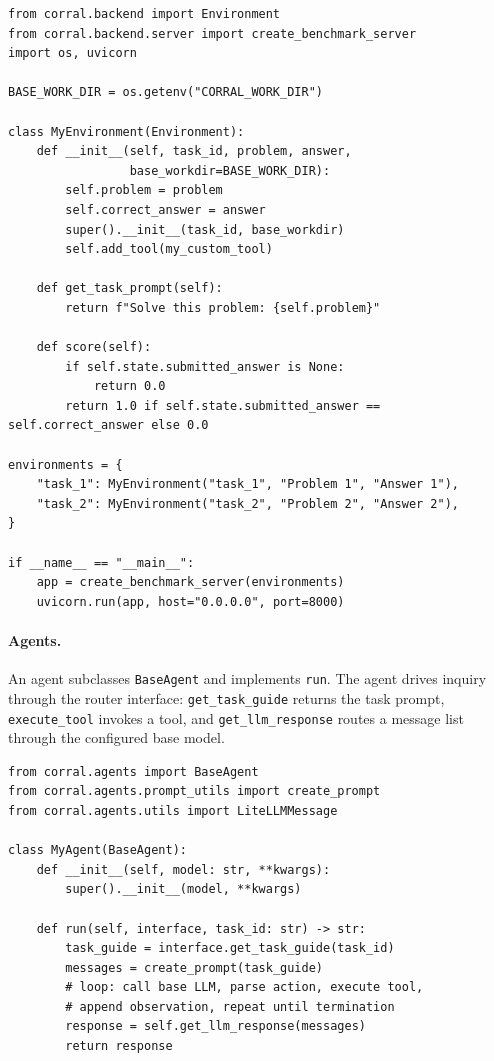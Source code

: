 \begin{lstlisting}[caption={Defining and serving an environment.}]
from corral.backend import Environment
from corral.backend.server import create_benchmark_server
import os, uvicorn

BASE_WORK_DIR = os.getenv("CORRAL_WORK_DIR")

class MyEnvironment(Environment):
    def __init__(self, task_id, problem, answer,
                 base_workdir=BASE_WORK_DIR):
        self.problem = problem
        self.correct_answer = answer
        super().__init__(task_id, base_workdir)
        self.add_tool(my_custom_tool)

    def get_task_prompt(self):
        return f"Solve this problem: {self.problem}"

    def score(self):
        if self.state.submitted_answer is None:
            return 0.0
        return 1.0 if self.state.submitted_answer == self.correct_answer else 0.0

environments = {
    "task_1": MyEnvironment("task_1", "Problem 1", "Answer 1"),
    "task_2": MyEnvironment("task_2", "Problem 2", "Answer 2"),
}

if __name__ == "__main__":
    app = create_benchmark_server(environments)
    uvicorn.run(app, host="0.0.0.0", port=8000)
\end{lstlisting}

\paragraph{Agents.} An agent subclasses \texttt{BaseAgent} and implements \texttt{run}. The agent drives inquiry through the router interface: \texttt{get\_task\_guide} returns the task prompt, \texttt{execute\_tool} invokes a tool, and \texttt{get\_llm\_response} routes a message list through the configured base model.

\begin{lstlisting}[caption={Defining a custom scaffold.}]
from corral.agents import BaseAgent
from corral.agents.prompt_utils import create_prompt
from corral.agents.utils import LiteLLMMessage

class MyAgent(BaseAgent):
    def __init__(self, model: str, **kwargs):
        super().__init__(model, **kwargs)

    def run(self, interface, task_id: str) -> str:
        task_guide = interface.get_task_guide(task_id)
        messages = create_prompt(task_guide)
        # loop: call base LLM, parse action, execute tool,
        # append observation, repeat until termination
        response = self.get_llm_response(messages)
        return response
\end{lstlisting}


